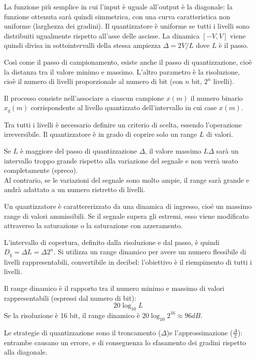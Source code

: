 La funzione più semplice in cui l'input è uguale all'output è la diagonale: la funzione ottenuta sarà quindi simmetrica, con una curva caratteristica non uniforme (larghezza dei gradini). Il quantizzatore è uniforme se tutti i livelli sono distribuiti ugualmente rispetto all'asse delle ascisse. La dinamica $[-V, V]$ viene quindi divisa in sottointervalli della stessa ampiezza $\Delta = 2V / L$ dove $L$ è il passo. 

Così come il passo di campionamento, esiste anche il passo di quantizzazione, cioè la distanza tra il valore minimo e massimo. L'altro parametro è la risoluzione, cioè il numero di livelli proporzionale al numero di bit (con $n$ bit, $2^n$ livelli). 

Il processo consiste nell'associare a ciascun campione $x(m)$ il numero binario $x_q(m)$ corrispondente al livello quantizzato dell'intervallo in cui case $x(m)$.

Tra tutti i livelli è necessario definire un criterio di scelta, essendo l'operazione irreversibile. Il quantizzatore è in grado di coprire solo un range $L$ di valori.

Se $L$ è maggiore del passo di quantizzazione $\Delta$, il valore massimo $L\Delta$ sarà un intervallo troppo grande rispetto alla variazione del segnale e non verrà usato completamente (spreco). \\
Al contrario, se le variazioni del segnale sono molto ampie, il range sarà grande e andrà adattato a un numero ristretto di livelli. 

Un quantizzatore è carattererizzato da una dinamica di ingresso, cioé un massimo range di valori ammissibili. Se il segnale supera gli estremi, esso viene modificato attraverso la saturazione o la saturazione con azzeramento.

L'intervallo di copertura, definito dalla risoluzione e dal passo, è quindi $D_q = \Delta L = \Delta 2^n$. Si utilizza un range dinamico per avere un numero flessibile di livelli rappresentabili, convertibile in decibel: l'obiettivo è il riempimento di tutti i livelli.

Il range dinamico è il rapporto tra il numero minimo e massimo di valori rappresentabili (espressi dal numero di bit):
$$20\log_{10} L$$
Se la risoluzione è 16 bit, il range dinamico è $20\log_{10} 2^{16} \approx 96 dB$.

Le strategie di quantizzazione sono il troncamento ($\Delta$)e l'approssimazione ($\frac{\Delta}{2}$): entrambe causano un errore, e di conseguenza lo sfasamento dei gradini rispetto alla diagonale. 

